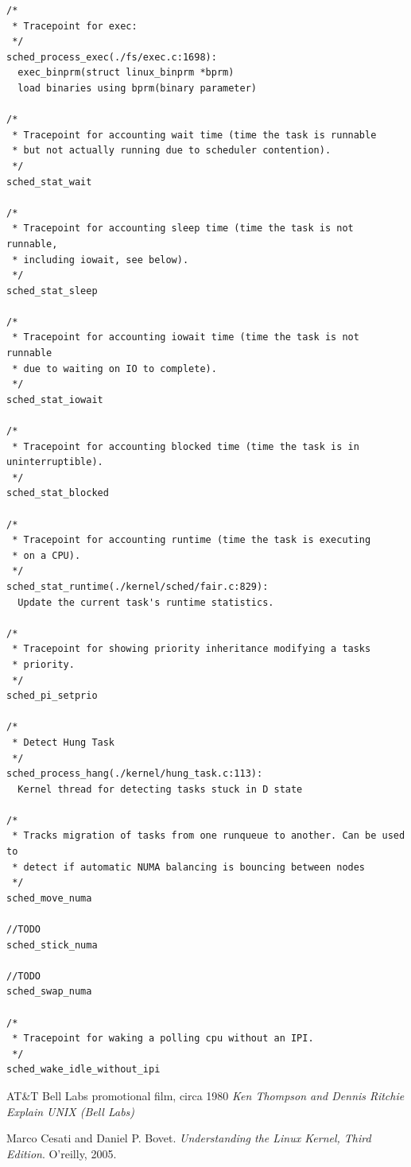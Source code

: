 \documentclass[10pt]{book}
\begin{document}
\begin{verbatim}
/*
 * Tracepoint for exec:
 */
sched_process_exec(./fs/exec.c:1698):
  exec_binprm(struct linux_binprm *bprm)
  load binaries using bprm(binary parameter)

/*
 * Tracepoint for accounting wait time (time the task is runnable
 * but not actually running due to scheduler contention).
 */
sched_stat_wait

/*
 * Tracepoint for accounting sleep time (time the task is not runnable,
 * including iowait, see below).
 */
sched_stat_sleep

/*
 * Tracepoint for accounting iowait time (time the task is not runnable
 * due to waiting on IO to complete).
 */
sched_stat_iowait

/*
 * Tracepoint for accounting blocked time (time the task is in uninterruptible).
 */
sched_stat_blocked

/*
 * Tracepoint for accounting runtime (time the task is executing
 * on a CPU).
 */
sched_stat_runtime(./kernel/sched/fair.c:829):
  Update the current task's runtime statistics.

/*
 * Tracepoint for showing priority inheritance modifying a tasks
 * priority.
 */
sched_pi_setprio

/*
 * Detect Hung Task
 */
sched_process_hang(./kernel/hung_task.c:113):
  Kernel thread for detecting tasks stuck in D state

/*
 * Tracks migration of tasks from one runqueue to another. Can be used to
 * detect if automatic NUMA balancing is bouncing between nodes
 */
sched_move_numa

//TODO
sched_stick_numa

//TODO
sched_swap_numa

/*
 * Tracepoint for waking a polling cpu without an IPI.
 */
sched_wake_idle_without_ipi
\end{verbatim}
\begin{thebibliography}{}
AT\&T Bell Labs promotional film, circa 1980
\textit{Ken Thompson and Dennis Ritchie Explain UNIX (Bell Labs)} %

Marco Cesati and Daniel P. Bovet.
\textit{Understanding the Linux Kernel, Third Edition}.
O'reilly, 2005.
\end{thebibliography}
\end{document}
